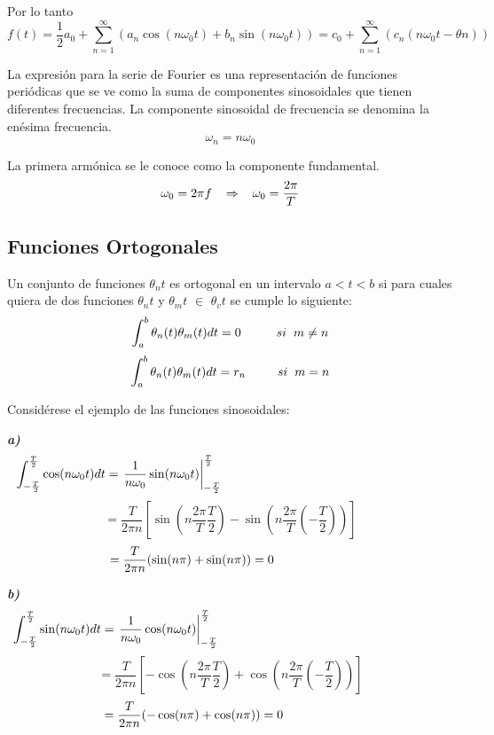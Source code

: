 \documentclass[a4paper]{article}
\begin{document}
{} Por lo tanto  
\[
f(t)=\frac{1}{2}a_{0}+\sum_{n=1}^{\infty}{\left(a_{n}\cos
(n\omega_{0}t)+b_{n}\sin (n\omega_{0}t)\right)} =
c_{0}+\sum_{n=1}^{\infty}\left(c_{n}(n\omega_{0}t-\theta n)\right)
\]

{} La expresi\'on para la serie de Fourier es una representaci\'on de
funciones peri\'odicas que se ve como la suma de componentes sinosoidales
que tienen diferentes frecuencias. La componente sinosoidal de frecuencia se
denomina la en\'esima frecuencia.  
\[
\omega_{n}=n\omega_{0}
\]

{} La primera arm\'onica se le conoce como la componente fundamental.  
\[
\omega_{0}=2\pi f \hspace{0.3cm} \Rightarrow \hspace{0.3cm} \omega_{0}=\frac{%
2\pi}{T}
\]


\subsection{Funciones Ortogonales}

Un conjunto de funciones $\theta_{n}t$ es ortogonal en un intervalo $a<t<b$
si para cuales quiera de dos funciones $\theta_{n}t$ y $\theta_{m}t$ $\in$ $%
\theta_{v}t$ se cumple lo siguiente:  
\[
\int_{a}^{b}\theta_{n}(t)\theta_{m}(t)dt=0 \hspace{1cm} si \hspace{0.2cm}%
m\neq n
\]
\[
\int_{a}^{b}\theta_{n}(t)\theta_{m}(t)dt=r_{n} \hspace{0.9cm} si \hspace{%
0.2cm}m=n
\]
\newline

{} Consid\'erese el ejemplo de las funciones sinosoidales:  \newline

{} \textbf{\textit{a)}}  
\[
\int_{-\frac{T}{2}}^{\frac{T}{2}}\cos(n\omega_{0}t)dt=\left.\frac{1}{%
n\omega_{0}}\sin(n\omega_{0}t)\right|_{-\frac{T}{2}}^{\frac{T}{2}} \hspace{%
6.3cm}
\]
\[
=\frac{T}{2\pi n}\left[\sin \left(n\frac{2\pi}{T}\frac{T}{2}
\right)-\sin\left(n\frac{2\pi}{T}\left(-\frac{T}{2}\right) \right) \right]
\]
\[
=\frac{T}{2\pi n}(\sin(n\pi)+\sin(n\pi))=0 \hspace{2.2cm}
\]

{} \textbf{\textit{b)}}  
\[
\int_{-\frac{T}{2}}^{\frac{T}{2}}\sin(n\omega_{0}t)dt=\left.\frac{1}{%
n\omega_{0}}\cos(n\omega_{0}t)\right|_{-\frac{T}{2}}^{\frac{T}{2}} \hspace{%
6.5cm}
\]
\[
=\frac{T}{2\pi n}\left[-\cos \left(n\frac{2\pi}{T}\frac{T}{2}
\right)+\cos\left(n\frac{2\pi}{T}\left(-\frac{T}{2}\right) \right) \right]
\]
\[
=\frac{T}{2\pi n}(-\cos(n\pi)+\cos(n\pi))=0 \hspace{2.1cm}
\]
\end{document}

